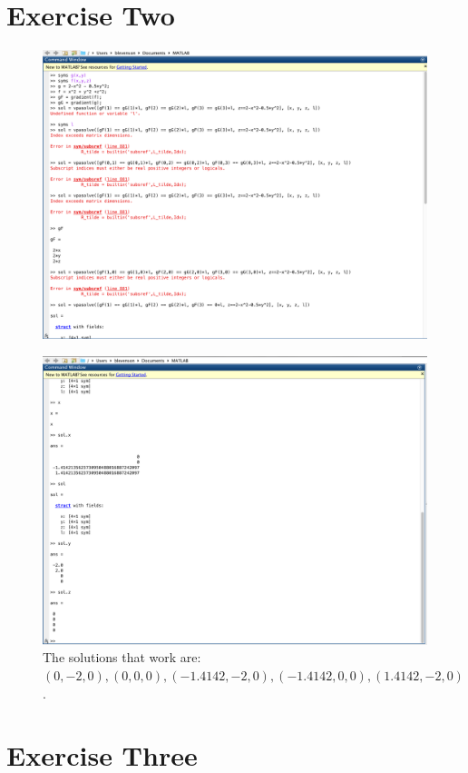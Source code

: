 \documentclass[11pt]{article}
\begin{document}
\section*{Exercise Two}
\begin{figure}[H]
	\centering
	\includegraphics[width=\textwidth]{Prob2PartA.png}
\end{figure}
\begin{figure}[H]
	\centering
	\includegraphics[width=\textwidth]{Prob2PartB.png}
	\caption{The solutions that work are: $(0, -2, 0), (0,0,0), (-1.4142, -2, 0), (-1.4142, 0, 0), (1.4142, -2, 0)$.}
\end{figure}

\section*{Exercise Three}
\end{document}
